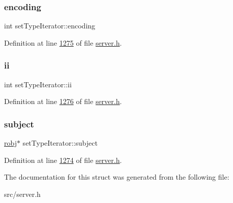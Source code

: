 \mbox{\label{structsetTypeIterator_ac5fbe60f8e4e0e0a6c048267ea7182a4}} 
\subsubsection{\texorpdfstring{encoding}{encoding}}
{\footnotesize\ttfamily int set\+Type\+Iterator\+::encoding}



Definition at line \hyperlink{server_8h_source_l01275}{1275} of file \hyperlink{server_8h_source}{server.\+h}.

\mbox{\label{structsetTypeIterator_a44cea1256505ead86e65bf00a5d107d6}} 
\subsubsection{\texorpdfstring{ii}{ii}}
{\footnotesize\ttfamily int set\+Type\+Iterator\+::ii}



Definition at line \hyperlink{server_8h_source_l01276}{1276} of file \hyperlink{server_8h_source}{server.\+h}.

\mbox{\label{structsetTypeIterator_affbd13bac6696496ab154e8c24fb3329}} 
\subsubsection{\texorpdfstring{subject}{subject}}
{\footnotesize\ttfamily \hyperlink{structredisObject}{robj}$\ast$ set\+Type\+Iterator\+::subject}



Definition at line \hyperlink{server_8h_source_l01274}{1274} of file \hyperlink{server_8h_source}{server.\+h}.



The documentation for this struct was generated from the following file\+:\begin{DoxyCompactItemize}
\item 
src/server.\+h\end{DoxyCompactItemize}
